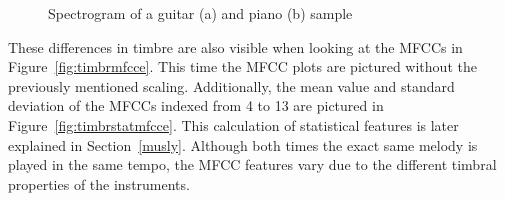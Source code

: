 \begin{figure}[htbp]
	\centering
	\caption{Spectrogram of a guitar (a) and piano (b) sample}	
	\label{fig:timbre}
\end{figure}
\FloatBarrier
\noindent These differences in timbre are also visible when looking at the MFCCs in Figure~\ref{fig:timbrmfcce}. This time the MFCC plots are pictured without the previously mentioned scaling. Additionally, the mean value and standard deviation of the MFCCs indexed from 4 to 13 are pictured in Figure~\ref{fig:timbrstatmfcce}. This calculation of statistical features is later explained in Section~\ref{musly}. Although both times the exact same melody is played in the same tempo, the MFCC features vary due to the different timbral properties of the instruments. 
